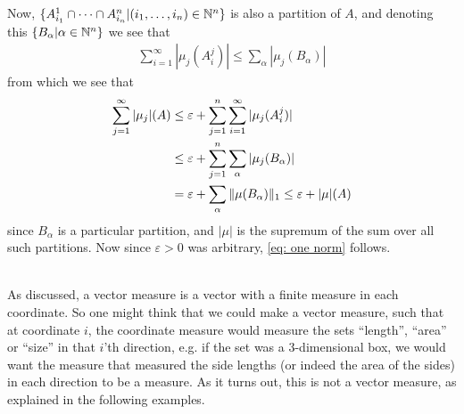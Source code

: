 Now, $\{ A_{i_{1}}^{1} \cap \dots \cap A_{i_{n}}^{n} | (i_{1}, \dots, i_{n}) \in \mathbb{N}^{n} \}$ is also a partition of $A$, and denoting this $\{ B_{\alpha} | \alpha \in \mathbb{N}^{n} \}$ we see that
\begin{align*}
	\sum_{i=1}^{\infty} | \mu_{j} (A_{i}^{j}) | \le \sum_{\alpha} | \mu_{j} (B_{\alpha}) |
\end{align*}
from which we see that
\begin{align*}
	\sum_{j=1}^{\infty} |\mu_{j} | (A) &\le \varepsilon +  \sum_{j=1}^{n} \sum_{i=1}^{\infty} | \mu_{j}(A_{i}^{j})| \\
	&\le \varepsilon + \sum_{j=1}^{n} \sum_{\alpha} | \mu_{j}(B_{\alpha})| \\
	&= \varepsilon + \sum_{\alpha} \Vert{\mu (B_{\alpha})}\Vert_{1}   \le \varepsilon + |\mu|(A) \\
\end{align*}
since $B_{\alpha}$ is a particular partition, and $|\mu|$ is the supremum of the sum over all such partitions. Now since $\varepsilon>0$ was arbitrary, \eqref{eq: one norm} follows.




\text{ }\\
As discussed, a vector measure is a vector with a finite measure in each coordinate. So one might think that we could make a vector measure, such that at coordinate $i$, the coordinate measure would measure the sets ``length'', ``area'' or ``size'' in that $i$'th direction, e.g. if the set was a 3-dimensional box, we would want the measure that measured the side lengths (or indeed the area of the sides) in each direction to be a measure. As it turns out, this is not a vector measure, as explained in the following examples.


